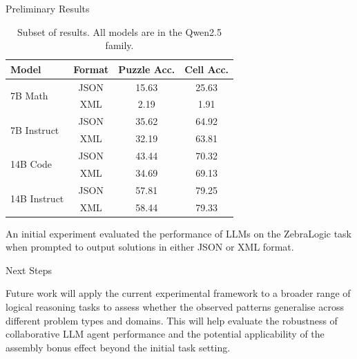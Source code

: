 \documentclass[final]{beamer}
\newlength{\onecolwid}
\begin{document}
\begin{frame}[t]
\begin{columns}[t]
\begin{column}{\onecolwid}
\begin{block}{Preliminary Results}
    {\footnotesize
    \begin{table}[h!]
        \centering
        \begin{tabular}{|l|c|c|c|}
        \hline
        \textbf{Model} & \textbf{Format} & \textbf{Puzzle Acc.} & \textbf{Cell Acc.} \\
        \hline
        \multirow{2}{*}{7B Math} & JSON & 15.63 & 25.63 \\
                                & XML & 2.19 & 1.91 \\
        \hline
        \multirow{2}{*}{7B Instruct} & JSON & 35.62 & 64.92 \\
                                & XML & 32.19 & 63.81 \\
        \hline
        \multirow{2}{*}{14B Code} & JSON & 43.44 & 70.32 \\
                                & XML & 34.69 & 69.13 \\
        \hline
        \multirow{2}{*}{14B Instruct} & JSON & 57.81 & 79.25 \\
                                & XML & 58.44 & 79.33 \\
        \hline

        \end{tabular}
        \caption{Subset of results. All models are in the Qwen2.5 family.}
    \end{table}
    }
    An initial experiment evaluated the performance of LLMs on the ZebraLogic task when prompted to output solutions in either JSON or XML format. 


\end{block}


\begin{block}{Next Steps}

    Future work will apply the current experimental framework to a broader range of logical reasoning tasks to assess whether the observed patterns generalise across different problem types and domains. This will help evaluate the robustness of collaborative LLM agent performance and the potential applicability of the assembly bonus effect beyond the initial task setting.

\end{block}


\end{column}
\end{columns}
\end{frame}
\end{document}
